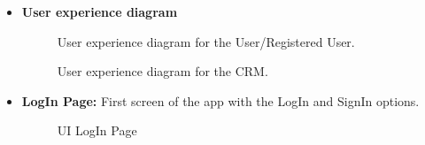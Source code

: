 \documentclass[a4paper]{article}
\begin{document}
\begin {itemize}

\item \textbf{User experience diagram}
\begin{figure}[h]
\centering
\vspace*{\fill}
\noindent{}%
\caption {User experience diagram for the User/Registered User.}
\vspace*{0.2cm}
\end{figure}
\newpage
\begin{figure}[h]
\centering
\vspace*{\fill}
\noindent{}%
\caption {User experience diagram for the CRM.}
\vspace*{0.2cm}
\end{figure}
\pagebreak
\item \textbf{LogIn Page:} First screen of the app with the LogIn and SignIn options.
\begin{figure}[h]
\centering
\vspace*{\fill}
\noindent{}%
\caption {UI LogIn Page}
\vspace*{0.2cm}
\end{figure}


\end{itemize}
\end{document}

